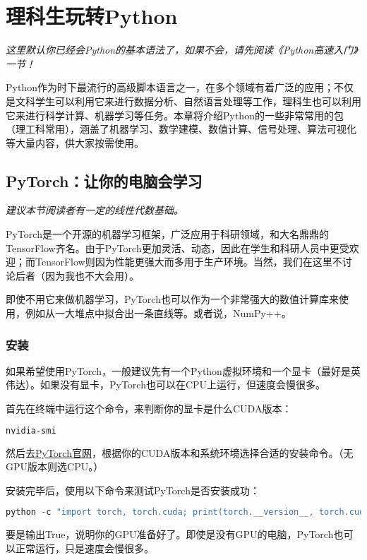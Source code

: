 \documentclass[../main.tex]{subfiles}
\begin{document}
\chapter{理科生玩转Python}\label{chap:python-advanced}
\begin{flushright}
  \emph{这里默认你已经会Python的基本语法了，如果不会，请先阅读《Python高速入门》一节！}
\end{flushright}

Python作为时下最流行的高级脚本语言之一，在多个领域有着广泛的应用；不仅是文科学生可以利用它来进行数据分析、自然语言处理等工作，理科生也可以利用它来进行科学计算、机器学习等任务。本章将介绍Python的一些非常常用的包（理工科常用），涵盖了机器学习、数学建模、数值计算、信号处理、算法可视化等大量内容，供大家按需使用。

\section{PyTorch：让你的电脑会学习}
\begin{flushright}
  \emph{建议本节阅读者有一定的线性代数基础。}
\end{flushright}

PyTorch是一个开源的机器学习框架，广泛应用于科研领域，和大名鼎鼎的TensorFlow齐名。由于PyTorch更加灵活、动态，因此在学生和科研人员中更受欢迎；而TensorFlow则因为性能更强大而多用于生产环境。当然，我们在这里不讨论后者（因为我也不大会用）。

即使不用它来做机器学习，PyTorch也可以作为一个非常强大的数值计算库来使用，例如从一大堆点中拟合出一条直线等。或者说，NumPy++。

\subsection{安装}

如果希望使用PyTorch，一般建议先有一个Python虚拟环境和一个显卡（最好是英伟达）。如果没有显卡，PyTorch也可以在CPU上运行，但速度会慢很多。

首先在终端中运行这个命令，来判断你的显卡是什么CUDA版本：
\begin{lstlisting}[language=bash]
nvidia-smi
\end{lstlisting}

然后去\href{https://pytorch.org/get-started/locally/}{PyTorch官网}，根据你的CUDA版本和系统环境选择合适的安装命令。（无GPU版本则选CPU。）

安装完毕后，使用以下命令来测试PyTorch是否安装成功：
\begin{lstlisting}[language=python]
python -c "import torch, torch.cuda; print(torch.__version__, torch.cuda.is_available())"
\end{lstlisting}
要是输出True，说明你的GPU准备好了。即使是没有GPU的电脑，PyTorch也可以正常运行，只是速度会慢很多。
\end{document}
